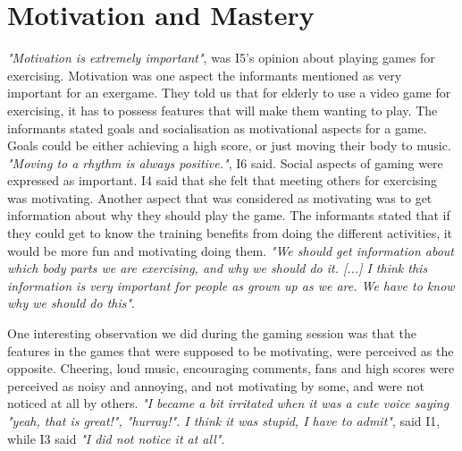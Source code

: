 \section{Motivation and Mastery}

\emph{"Motivation is extremely important"}, was I5's opinion about playing games for exercising. Motivation was one aspect the informants mentioned as very important for an exergame. They told us that for elderly to use a video game for exercising, it has to possess features that will make them wanting to play. The informants stated goals and socialisation as motivational aspects for a game. Goals could be either achieving a high score, or just moving their body to music. \emph{"Moving to a rhythm is always positive."}, I6 said. Social aspects of gaming were expressed as important. I4 said that she felt that meeting others for exercising was motivating. Another aspect that was considered as motivating was to get information about why they should play the game. The informants stated that if they could get to know the training benefits from doing the different activities, it would be more fun and motivating doing them. \emph{"We should get information about which body parts we are exercising, and why we should do it. [...] I think this information is very important for people as grown up as we are. We have to know why we should do this"}. 

One interesting observation we did during the gaming session was that the features in the games that were supposed to be motivating, were perceived as the opposite. Cheering, loud music, encouraging comments, fans and high scores were perceived as noisy and annoying, and not motivating by some, and were not noticed at all by others. \emph{"I became a bit irritated when it was a cute voice saying "yeah, that is great!", "hurray!". I think it was stupid, I have to admit"}, said I1, while I3 said \emph{"I did not notice it at all"}. 

